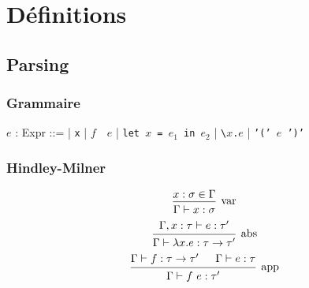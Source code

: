 \documentclass{beamer}
\begin{document}
\section{Définitions}
\subsection{Parsing}
\begin{frame}
		\frametitle{Grammaire}
		\begin{center}
		\begin{bnf}
				$e$ : \textsf{Expr} ::= 
				| \texttt{x} 
				| \texttt{$f \quad e$} 
				| \texttt{let $x$ = $e_1$ in $e_2$} 
				| \texttt{\textbackslash$x$.$e$}
				| \texttt{'(' $e$ ')'}
		\end{bnf} 
\end{center}
\end{frame}

\begin{frame}
\frametitle{Hindley-Milner}
		\[
		\begin{prooftree}
				\hypo{x:\sigma\in\Gamma}
				\infer1[var]{\Gamma \vdash x:\sigma}
		\end{prooftree}
		\]
		\newline
		\[
		\begin{prooftree}
				\hypo{\Gamma, x:\tau \vdash e:\tau'}
				\infer1[abs]{\Gamma \vdash \lambda x.e:\tau \to \tau'}
		\end{prooftree}
		\]
		\newline
		\[
		\begin{prooftree}
				\hypo{\Gamma \vdash f:\tau \to \tau'}
				\hypo{\Gamma \vdash e : \tau}
				\infer2[app]{\Gamma \vdash f\ e : \tau'}
		\end{prooftree}
		\]
\end{frame}
\end{document}
